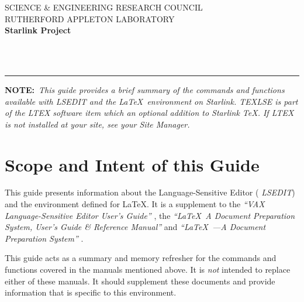 \thispagestyle{empty}
SCIENCE \& ENGINEERING RESEARCH COUNCIL \hfill \stardocname\\
RUTHERFORD APPLETON LABORATORY\\
{\large\bf Starlink Project\\}
{\large\bf \stardoccategory\ \stardocnumber}
\begin{flushright}
\stardocauthors\\
\stardocdate
\end{flushright}
\vspace{-4mm}
\rule{\textwidth}{0.5mm}
\vspace{5mm}
\begin{center}
{\Large\bf \stardoctitle}
\end{center}
\vspace{5mm}

{\bf NOTE:}~{\em This guide provides a brief summary of the commands and
functions available with {\sl LSEDIT\/} and the \LaTeX\ environment on
Starlink. TEXLSE is part of the LTEX software item which an optional addition
to Starlink \TeX . If LTEX is not installed at your site, see your Site
Manager.}

\setlength{\parskip}{0mm}
\tableofcontents
\setlength{\parskip}{\medskipamount}
\markright{\stardocname}

\newpage

\section*{Scope and Intent of this Guide}

This guide presents information about the Language-Sensitive Editor ({\sl
LSEDIT\/}) and the environment defined for \LaTeX.  It is a supplement to the
{\em ``VAX Language-Sensitive Editor User's Guide''\/} \cite{lse}, the
{\em ``\/\LaTeX\, A Document Preparation System, User's Guide \& Reference
Manual''\/} \cite{latex} and
{\em ``\/\LaTeX\ ---A Document Preparation System'' \/} \cite{sun9}.

\bigskip

This guide acts as a summary and memory refresher for the commands and
functions covered in the manuals mentioned above. It is {\em not\/} intended to
replace either of these manuals.  It should supplement these documents and
provide information that is specific to this environment.

